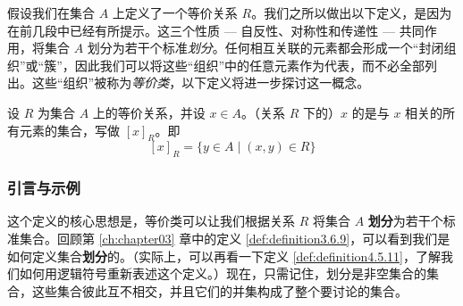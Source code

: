 假设我们在集合 $A$ 上定义了一个等价关系 $R$。我们之所以做出以下定义，是因为在前几段中已经有所提示。这三个性质 --- 自反性、对称性和传递性 --- 共同作用，将集合 $A$ 划分为若干个标准\emph{划分}。任何相互关联的元素都会形成一个``封闭组织''或``簇''，因此我们可以将这些``组织''中的任意元素作为代表，而不必全部列出。这些``组织''被称为\emph{等价类}，以下定义将进一步探讨这一概念。

\begin{definition}
    设 $R$ 为集合 $A$ 上的等价关系，并设 $x \in A$。（关系 $R$ 下的）$x$ 的是与 $x$ 相关的所有元素的集合，写做 $[x]_R$。即
    \[[x]_R = \{y \in A \mid (x,y) \in R\}\]
\end{definition}

\subsubsection*{引言与示例}

这个定义的核心思想是，等价类可以让我们根据关系 $R$ 将集合 $A$ \textbf{划分}为若干个标准集合。回顾第 \ref{ch:chapter03} 章中的定义 \ref{def:definition3.6.9}，可以看到我们是如何定义集合\textbf{划分}的。（实际上，可以再看一下定义 \ref{def:definition4.5.11}，了解我们如何用逻辑符号重新表述这个定义。）现在，只需记住，划分是非空集合的集合，这些集合彼此互不相交，并且它们的并集构成了整个要讨论的集合。\\

